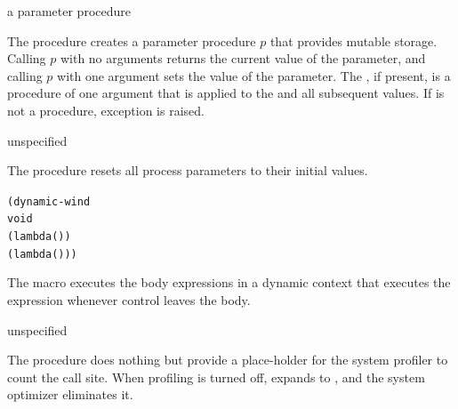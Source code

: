 \begin{procedure}
\end{procedure}
\returns{} a parameter procedure

The  procedure creates a parameter
procedure $p$ that provides mutable storage. Calling $p$ with no
arguments returns the current value of the parameter, and calling $p$
with one argument sets the value of the parameter. The ,
if present, is a procedure of one argument that is applied to the
 and all subsequent values. If  is not a
procedure, exception  is raised.

\begin{procedure}
\end{procedure}
\returns{} unspecified

The  procedure resets all process
parameters to their initial values.

\begin{syntax}
\end{syntax}
\expandsto{}\begin{alltt}\antipar
(dynamic-wind
  void
  (lambda ()   \etc{})
  (lambda () ))\end{alltt}

The  macro executes the body expressions 
 \etc{} in a dynamic context that executes the 
expression whenever control leaves the body.

\begin{procedure}
\end{procedure}
\returns{} unspecified

The  procedure does nothing but provide a
place-holder for the system profiler to count the call site. When
profiling is turned off,  expands to
, and the system optimizer eliminates it.

